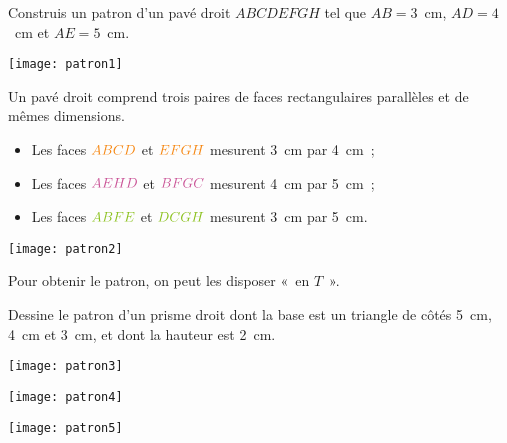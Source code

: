 \begin{methode*1}

 \begin{exemple*1}
Construis un patron d'un pavé droit $ABCDEFGH$ tel que $AB = 3$ cm, $AD = 4$ cm et $AE = 5$ cm. 
\begin{center} \texttt{[image: patron1]} \end{center}

 \begin{minipage}[c]{0.75\linewidth}
Un pavé droit comprend trois paires de faces rectangulaires parallèles et de mêmes dimensions.
\begin{itemize}
 \item Les faces ${\textcolor{J1}{ABCD}}$ et $\textcolor{J1}{EFGH}$ mesurent 3 cm par 4 cm ; 
 \item Les faces $\textcolor{C2}{AEHD}$ et $\textcolor{C2}{BFGC}$ mesurent 4 cm par 5 cm ; 
 \item Les faces $\textcolor{H1}{ABFE}$ et $\textcolor{H1}{DCGH}$ mesurent 3 cm par 5 cm.
 \end{itemize}
  \end{minipage} \hfill%
  \begin{minipage}[c]{0.23\linewidth} 
\texttt{[image: patron2]}  
  \end{minipage} 
Pour obtenir le patron, on peut les disposer « en $T$ ». 
 \end{exemple*1}

 \begin{exemple*1}
Dessine le patron d'un prisme droit dont la base est un triangle de côtés 5 cm, 4 cm et 3 cm, et dont la hauteur est 2 cm.
   
 \begin{minipage}[c]{0.3\linewidth}     
\vspace{-0.2cm}
\begin{center} \texttt{[image: patron3]} \end{center}
  \end{minipage} \hfill%
  \begin{minipage}[c]{0.3\linewidth}
\begin{center} \texttt{[image: patron4]} \end{center}
  \end{minipage} \hfill%
   \begin{minipage}[c]{0.3\linewidth}   
\begin{center} \texttt{[image: patron5]} \end{center}
   \end{minipage} \\
   

\end{exemple*1}
\end{methode*1}
